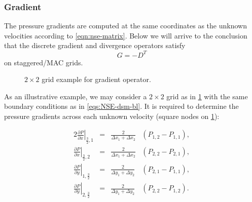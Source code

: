 \documentclass{article}
\begin{document}
\subsubsection{Gradient}\label{subsec:gradient} 

The pressure gradients are computed at the same coordinates as the unknown velocities according to \cref{eqn:nse-matrix}. Below we will arrive to the conclusion that the discrete gradient and divergence operators satisfy
\begin{equation}\label{eqn:g-dt}
  {G}=-{D^T}
\end{equation}
on staggered/MAC grids. 

\begin{figure}[H] %
  \caption{$2\times 2$ grid example for gradient operator.}\label{fig:G-example-2x2}
\end{figure}


As an illustrative example, we may consider a $2\times 2$ grid as in \cref{fig:G-example-2x2} with the same boundary conditions as in \cref{eqs:NSE-dsm-bl}. It is required to determine the pressure gradients across each unknown velocity (square nodes on \cref{fig:G-example-2x2}):

\begin{alignat*}{2}
	\left.\frac{\partial P}{\partial x}\right|_{\frac{3}{2},1} &=&	\frac{2}{{\Delta x_1 + \Delta x_2}}&\left(P_{1,2}-P_{1,1}\right),\\
	\left.\frac{\partial P}{\partial x}\right|_{\frac{3}{2},2} &=&	\frac{2}{{\Delta x_1 + \Delta x_2}}&\left( P_{2,2}-P_{2,1} \right),\\
	\left.\frac{\partial P}{\partial y}\right|_{1,\frac{3}{2}} &=&	\frac{2}{{\Delta y_1 + \Delta y_2}}&\left(P_{2,1}-P_{1,1} \right),\\
	\left.\frac{\partial P}{\partial y}\right|_{2,\frac{3}{2}} &=&	\frac{2}{{\Delta y_1 + \Delta y_2}}&\left( P_{2,2}-P_{1,2} \right).
\end{alignat*}
\end{document}
